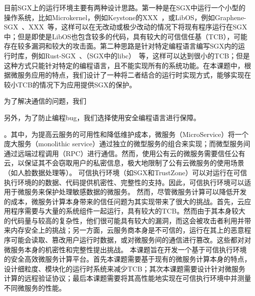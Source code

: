 目前SGX上的运行环境主要有两种设计思路。第一种是在SGX中运行一个小型的操作系统，比如Microkernel，例如Keystone的XXX~\cite{}，或LibOS，例如Graphene-SGX~\cite{}、XXX~\cite{}等，这样可以在无改动或极少改动的情况下将现有程序运行在SGX中；但是即使是LibOS也包含较多的代码，具有较大的可信信任基（TCB），可能存在较多漏洞和较大的攻击面。第二种思路是针对特定编程语言编写SGX内的运行时库，例如Rust-SGX~\cite{}、（SGX中的libc）~\cite{}等，这样可以达到很小的TCB；但是这种方式只能针对特定的编程语言，且不能实现所有的系统功能。在本课题中，根据微服务应用的特点，我们设计了一种将二者结合的运行时实现方式，能够实现在较小TCB的情况下为应用提供SGX的保护。

为了解决通信的问题，我们

另外，为了防止编程bug，我们选择使用安全编程语言进行保障。



。其中，为提高云服务的可用性和降低维护成本，微服务（MicroService）将一个庞大服务（monolithic service）通过独立的微型服务的组合来实现；而微型服务间通过远端过程调用（RPC）进行通信。然而，使用公有云的微服务需要信任公有云，以保证其不会窃取用户的私密信息，极大地限制了公有云微服务的使用场景（如人脸数据处理等）。
可信执行环境（如SGX和TrustZone）可以对运行在可信执行环境的的数据、代码提供机密性、完整性的支持。因此，可信执行环境可以适用于微服务来保护处理敏感数据的微服务。
然而，尽管微服务计算可以降低开发的成本，微服务计算本身带来的信任问题为其实现带来了很大的挑战。首先，云应用程序需要与大量的系统组件一起运行，具有较大的TCB。然而由于其本身较大的代码量与较高的复杂性，他们很可能具有较大的漏洞，而这会被攻击者利用并带来内存安全上的挑战；另一方面，云服务商本身是不可信的，运行在其上的恶意程序可能会读取、篡改用户运行时数据，或对微服务间的通信进行篡改。这些都对对微服务本身的机密性和完整性提出挑战。
本课题旨在开发一个基于可信执行环境的安全高效微服务计算平台。首先本课题需要基于现有的微服务计算本身的特点，设计细粒度、模块化的运行时系统来减少TCB；其次本课题需要设计针对微服务计算的远程验证协议；最后本课题需要将其高性能地实现在可信执行环境中并测量不同微服务的性能。

